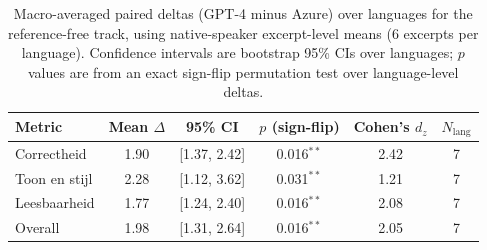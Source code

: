 \begin{table}[htbp]
\centering
\scriptsize
\renewcommand{\arraystretch}{1.15}
\setlength{\tabcolsep}{6pt}
\caption{Macro-averaged paired deltas (GPT-4 minus Azure) over languages for the reference-free track, using native-speaker excerpt-level means (6 excerpts per language). Confidence intervals are bootstrap 95\% CIs over languages; $p$ values are from an exact sign-flip permutation test over language-level deltas.}
\label{tab:ref-free-deltas-macro}
\begin{tabular}{@{}l c c c c c@{}}
\toprule
Metric & Mean $\Delta$ & 95\% CI & $p$ (sign-flip) & Cohen's $d_z$ & $N_{\text{lang}}$ \\
\midrule
Correctheid & 1.90 & [1.37, 2.42] & 0.016$^{**}$ & 2.42 & 7 \\
Toon en stijl & 2.28 & [1.12, 3.62] & 0.031$^{**}$ & 1.21 & 7 \\
Leesbaarheid & 1.77 & [1.24, 2.40] & 0.016$^{**}$ & 2.08 & 7 \\
Overall & 1.98 & [1.31, 2.64] & 0.016$^{**}$ & 2.05 & 7 \\
\bottomrule
\end{tabular}
\end{table}
